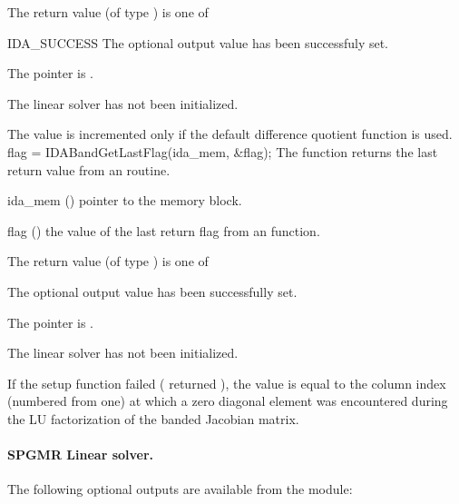 {
  The return value  (of type ) is one of
  \begin{args}
  \item[IDA\_SUCCESS] 
    The optional output value has been successfuly set.
  \item[\Id{IDABAND\_MEM\_NULL}]
    The  pointer is .
  \item[\Id{IDABAND\_LMEM\_NULL}]
    The {\idaband} linear solver has not been initialized.
  \end{args}
}
{
  The value  is incremented only if the default 
   difference quotient function is used.
}
{
  flag = IDABandGetLastFlag(ida\_mem, \&flag);
}
{
  The function  returns the
  last return value from an {\idaband} routine. 
}
{
  \begin{args}
  \item[ida\_mem] ()
    pointer to the {\ida} memory block.
  \item[flag] ()
    the value of the last return flag from an {\idaband} function.
  \end{args}
}
{
  The return value  (of type ) is one of
  \begin{args}
  \item[\Id{IDABAND\_SUCCESS}] 
    The optional output value has been successfully set.
  \item[\Id{IDABAND\_MEM\_NULL}]
    The  pointer is .
  \item[\Id{IDABAND\_LMEM\_NULL}]
    The {\idaband} linear solver has not been initialized.
  \end{args}
}
{
  If the {\idaband} setup function failed ( returned
  ), the value  is equal to the column index
  (numbered from one) at which a zero diagonal element was encountered during
  the LU factorization of the banded Jacobian matrix.
}
%
%
\noindent\paragraph{\bf SPGMR Linear solver.}
The following optional outputs are available from the {\idaspgmr} module:
